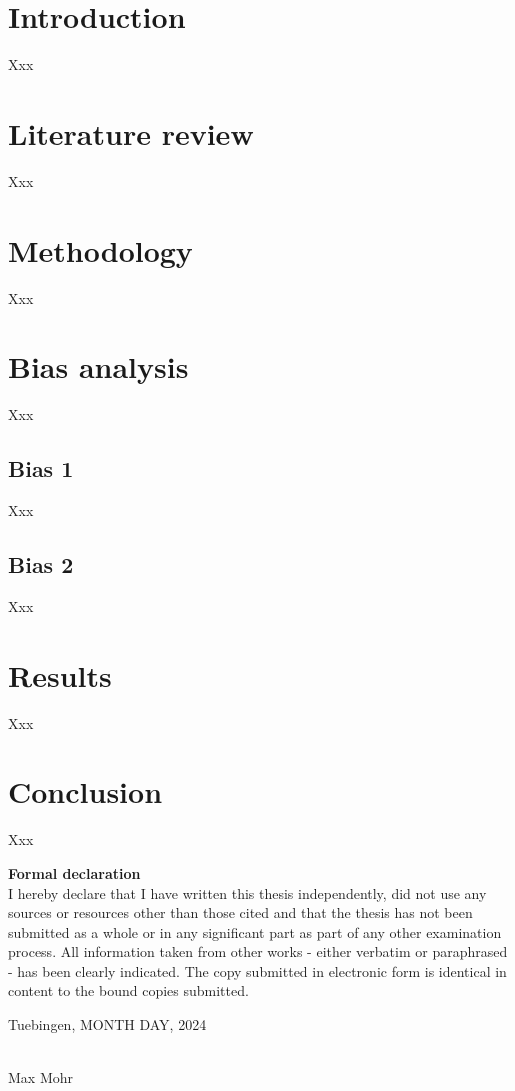 \documentclass[12pt, a4paper, titlepage]{article}
\begin{document}
\section{Introduction}
Xxx

\section{Literature review}
Xxx


\section{Methodology}
Xxx


\section{Bias analysis}
Xxx

\subsection{Bias 1}
Xxx

\subsection{Bias 2}
Xxx


\section{Results}
Xxx


\section{Conclusion}
Xxx


\clearpage
{} %
\setcounter{page}{3}
\printbibliography

\newpage
{\Large\textbf{Formal declaration}}\\

I hereby declare that I have written this thesis independently, did not use any sources or resources other than those cited and that the thesis has not been submitted as a whole or in any significant part as part of any other examination process. All information taken from other works - either verbatim or paraphrased - has been clearly indicated. The copy submitted in electronic form is identical in content to the bound copies submitted.

\vspace{1cm}

Tuebingen, MONTH DAY, 2024

\vspace{1cm}
\makebox[5cm]{\hrulefill}\\
Max Mohr
\end{document}

